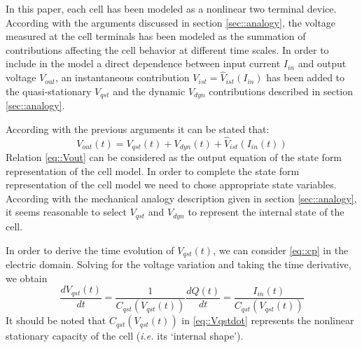 \documentclass[journal]{IEEEtran}
\begin{document}
In this paper, each cell has been modeled as a nonlinear two terminal device. According with the arguments discussed in section \ref{sec::analogy}, the voltage measured at the cell terminals has been modeled as the summation of contributions affecting the cell behavior at different time scales.
In order to include in the model a direct dependence between input current $I_{in}$ and output voltage $V_{out}$, an instantaneous contribution $V_{ist}=\hat{V}_{ist}(I_{in})$ has been added to the quasi-stationary $V_{qst}$ and the dynamic $V_{dyn}$ contributions described in section \ref{sec::analogy}.

According with the previous arguments it can be stated that:
\begin{equation}
V_{out}(t)=V_{qst}(t)+V_{dyn}(t)+\hat{V}_{ist}(I_{in}(t))
\label{eq::Vout}
\end{equation}
Relation \eqref{eq::Vout} can be considered as the output equation of the state form representation of the cell model. 
In order to complete the state form representation of the cell model we need to chose appropriate state variables. According with the mechanical analogy description given in section \ref{sec::analogy}, it seems reasonable to select $V_{qst}$ and $V_{dyn}$ to represent the internal state of the cell.

In order to derive the time evolution of $V_{qst}(t)$, we can consider \eqref{eq::cp} in the electric domain. Solving for the voltage variation and taking the time derivative, we obtain
\begin{equation}
\frac{dV_{qst}(t)}{dt}=\frac{1}{C_{qst}(V_{qst}(t))}\frac{dQ(t)}{dt}=\frac{I_{in}(t)}{C_{qst}(V_{qst}(t))}
\label{eq::Vqstdot}
\end{equation}
It should be noted that $C_{qst}(V_{qst}(t))$ in \eqref{eq::Vqstdot} represents the nonlinear stationary capacity of the cell (\textit{i.e.} its `internal shape').  
\end{document}
